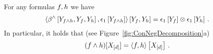 \begin{theorem}
    \label{the:effectiveConjunction}
    For any formulas $f,h$ we have
    \begin{align*}
        \left\langle 
            \beta^{\land}\left[Y_{f\land h},Y_{f},Y_{h}\right],\epsilon_1\left[Y_{f\land h}\right]
        \right\rangle \left[ Y_{f},Y_{h} \right]
        = \epsilon_1\left[Y_{f}\right] \otimes \epsilon_1\left[Y_{h}\right] \, .
    \end{align*}
    In particular, it holds that (see Figure~\ref{fig:ConNegDecomposition}a)
    \begin{align*}
    (f\land h)[X_{[d]}]
        = \left\langle f,h\right\rangle \left[ X_{[d]} \right] \, .
    \end{align*}
\end{theorem}
